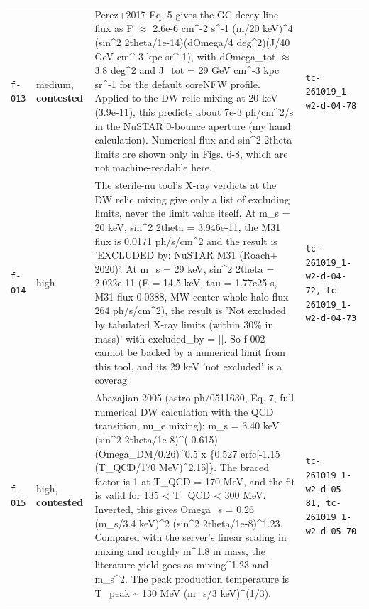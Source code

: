 \documentclass[11pt,a4paper]{article}
\begin{document}
\begin{longtable}{@{}p{}p{}p{}p{}@{}}
\texttt{f-013} & medium, \textbf{contested} & Perez+2017 Eq. 5 gives the GC decay-line flux as F $\approx$ 2.6e-6 cm\textasciicircum{}-2 s\textasciicircum{}-1 (m/20 keV)\textasciicircum{}4 (sin\textasciicircum{}2 2theta/1e-14)(dOmega/4 deg\textasciicircum{}2)(J/40 GeV cm\textasciicircum{}-3 kpc sr\textasciicircum{}-1), with dOmega\_tot $\approx$ 3.8 deg\textasciicircum{}2 and J\_tot = 29 GeV cm\textasciicircum{}-3 kpc sr\textasciicircum{}-1 for the default coreNFW profile. Applied to the DW relic mixing at 20 keV (3.9e-11), this predicts about 7e-3 ph/cm\textasciicircum{}2/s in the NuSTAR 0-bounce aperture (my hand calculation). Numerical flux and sin\textasciicircum{}2 2theta limits are shown only in Figs. 6-8, which are not machine-readable here. & \texttt{tc-261019\_\allowbreak{}1-w2-d-04-78} \\
\texttt{f-014} & high & The sterile-nu tool's X-ray verdicts at the DW relic mixing give only a list of excluding limits, never the limit value itself. At m\_s = 20 keV, sin\textasciicircum{}2 2theta = 3.946e-11, the M31 flux is 0.0171 ph/s/cm\textasciicircum{}2 and the result is 'EXCLUDED by: NuSTAR M31 (Roach+ 2020)'. At m\_s = 29 keV, sin\textasciicircum{}2 2theta = 2.022e-11 (E = 14.5 keV, tau = 1.77e25 s, M31 flux 0.0388, MW-center whole-halo flux 264 ph/s/cm\textasciicircum{}2), the result is 'Not excluded by tabulated X-ray limits (within 30\% in mass)' with excluded\_by = []. So f-002 cannot be backed by a numerical limit from this tool, and its 29 keV 'not excluded' is a coverag & \texttt{tc-261019\_\allowbreak{}1-w2-d-04-72,\allowbreak{} tc-261019\_\allowbreak{}1-w2-d-04-73} \\
\texttt{f-015} & high, \textbf{contested} & Abazajian 2005 (astro-ph/0511630, Eq. 7, full numerical DW calculation with the QCD transition, nu\_e mixing): m\_s = 3.40 keV (sin\textasciicircum{}2 2theta/1e-8)\textasciicircum{}(-0.615) (Omega\_DM/0.26)\textasciicircum{}0.5 x \{0.527 erfc[-1.15 (T\_QCD/170 MeV)\textasciicircum{}2.15]\}. The braced factor is 1 at T\_QCD = 170 MeV, and the fit is valid for 135 \textless{} T\_QCD \textless{} 300 MeV. Inverted, this gives Omega\_s = 0.26 (m\_s/3.4 keV)\textasciicircum{}2 (sin\textasciicircum{}2 2theta/1e-8)\textasciicircum{}1.23. Compared with the server's linear scaling in mixing and roughly m\textasciicircum{}1.8 in mass, the literature yield goes as mixing\textasciicircum{}1.23 and m\_s\textasciicircum{}2. The peak production temperature is T\_peak \textasciitilde{} 130 MeV (m\_s/3 keV)\textasciicircum{}(1/3). & \texttt{tc-261019\_\allowbreak{}1-w2-d-05-81,\allowbreak{} tc-261019\_\allowbreak{}1-w2-d-05-70} \\

\end{longtable}
\end{document}
